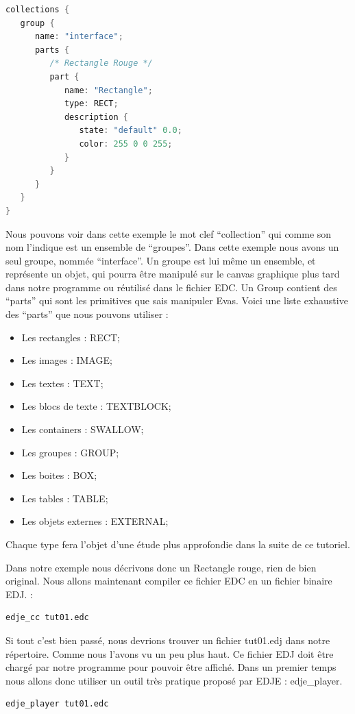 \documentclass[a4paper]{efr}
\begin{document}
\begin{lstlisting}[language=c]
 collections {
   group {
      name: "interface";
      parts {
         /* Rectangle Rouge */
         part {
            name: "Rectangle";
            type: RECT;
            description {
               state: "default" 0.0;
               color: 255 0 0 255;
            }
         }
      }
   }
}
\end{lstlisting}

Nous pouvons voir dans cette exemple le mot clef ``collection'' qui comme son
nom l'indique est un ensemble de ``groupes''.
Dans cette exemple nous avons un seul groupe, nommée ``interface''.
Un groupe est lui même un ensemble, et représente un objet, qui pourra être
manipulé sur le canvas graphique plus tard dans notre programme ou réutilisé
dans le fichier EDC.
Un Group contient des ``parts'' qui sont les primitives que sais manipuler Evas.
Voici une liste exhaustive des ``parts'' que nous pouvons utiliser :
\begin{itemize}
\item Les rectangles : RECT;
\item Les images : IMAGE;
\item Les textes : TEXT;
\item Les blocs de texte : TEXTBLOCK;
\item Les containers : SWALLOW;
\item Les groupes : GROUP;
\item Les boites : BOX;
\item Les tables : TABLE;
\item Les objets externes : EXTERNAL;
\end{itemize}
Chaque type fera l'objet d'une étude plus approfondie dans la suite de ce
tutoriel.

Dans notre exemple nous décrivons donc un Rectangle rouge, rien de bien
original. Nous allons maintenant compiler ce fichier EDC en un fichier binaire
EDJ.  :

\begin{lstlisting}
edje_cc tut01.edc
\end{lstlisting}

Si tout c'est bien passé, nous devrions trouver un fichier tut01.edj dans notre
répertoire. Comme nous l'avons vu un peu plus haut. Ce fichier EDJ doit être
chargé par notre programme pour pouvoir être affiché. Dans un premier temps nous
allons donc utiliser un outil très pratique proposé par EDJE : edje\_player.

\begin{lstlisting}
edje_player tut01.edc
\end{lstlisting}
\end{document}
